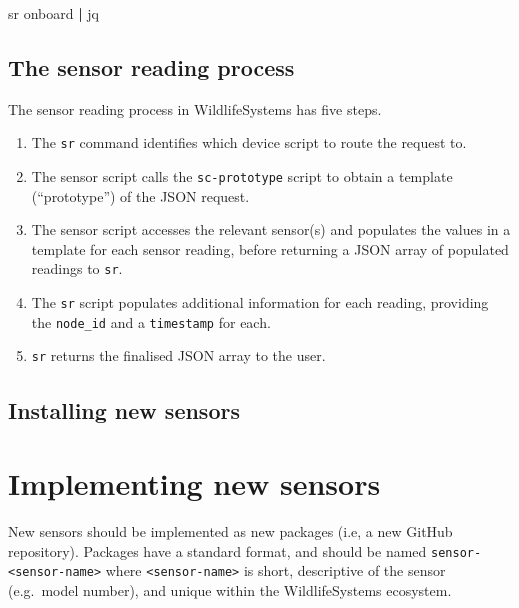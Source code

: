 \documentclass[
]{book}
\newenvironment{Shaded}{\begin{snugshade}}{\end{snugshade}}
\newcommand{\ExtensionTok}[1]{#1}
\newcommand{\KeywordTok}[1]{\textcolor[rgb]{0.13,0.29,0.53}{\textbf{#1}}}
\newcommand{\NormalTok}[1]{#1}
\begin{document}
\begin{Shaded}
\begin{Highlighting}[]
\ExtensionTok{sr}\NormalTok{ onboard }\KeywordTok{|} \ExtensionTok{jq}
\end{Highlighting}
\end{Shaded}

\section{The sensor reading process}\label{the-sensor-reading-process}

The sensor reading process in WildlifeSystems has five steps.

\begin{enumerate}
\def\labelenumi{\arabic{enumi}.}
\item
  The \texttt{sr} command identifies which device script to route the request to.
\item
  The sensor script calls the \texttt{sc-prototype} script to obtain a template (``prototype'') of the JSON request.
\item
  The sensor script accesses the relevant sensor(s) and populates the values in a template for each sensor reading, before returning a JSON array of populated readings to \texttt{sr}.
\item
  The \texttt{sr} script populates additional information for each reading, providing the \texttt{node\_id} and a \texttt{timestamp} for each.
\item
  \texttt{sr} returns the finalised JSON array to the user.
\end{enumerate}

\section{Installing new sensors}\label{installing-new-sensors}

\chapter{Implementing new sensors}\label{implementing-new-sensors}

New sensors should be implemented as new packages (i.e, a new GitHub repository). Packages have a standard format, and should be named \texttt{sensor-\textless{}sensor-name\textgreater{}} where \texttt{\textless{}sensor-name\textgreater{}} is short, descriptive of the sensor (e.g.~model number), and unique within the WildlifeSystems ecosystem.
\end{document}
